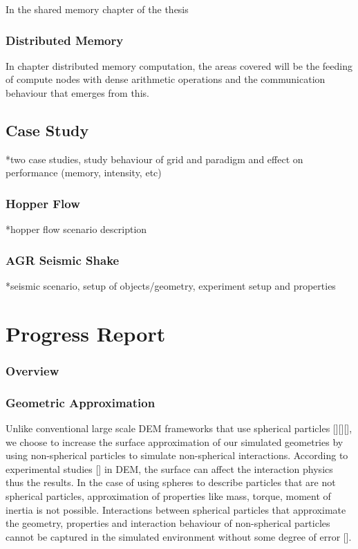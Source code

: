 \documentclass[times,12pt]{article}
\begin{document}
In the shared memory chapter of the thesis


\subsubsection{Distributed Memory}

In chapter distributed memory computation, the areas covered will be the feeding of compute nodes with dense arithmetic operations and the communication behaviour that emerges from this.


\subsection{Case Study}

*two case studies, study behaviour of grid and paradigm and effect on performance (memory, intensity, etc)

\subsubsection{Hopper Flow}

*hopper flow scenario description

\subsubsection{AGR Seismic Shake}

*seismic scenario, setup of objects/geometry, experiment setup and properties




\section{Progress Report}

\subsubsection{Overview}

\subsubsection{Geometric Approximation}

Unlike conventional large scale DEM frameworks that use spherical particles [][][], we choose to increase the surface approximation of our simulated geometries by using non-spherical particles to simulate non-spherical interactions. According to experimental studies [] in DEM, the surface can affect the interaction physics thus the results. In the case of using spheres to describe particles that are not spherical particles, approximation of properties like mass, torque, moment of inertia is not possible. Interactions between spherical particles that approximate the geometry, properties and interaction behaviour of non-spherical particles cannot be captured in the simulated environment without some degree of error []. 
\end{document}

